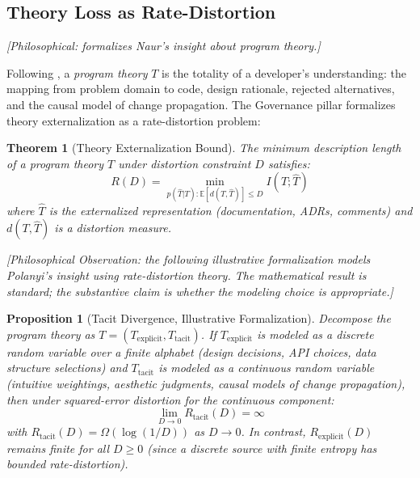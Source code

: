 \documentclass[11pt, a4paper]{googledeepmind}
\newtheorem{theorem}{Theorem}[section]
\newtheorem{proposition}{Proposition}[section]
\begin{document}
\subsection{Theory Loss as Rate-Distortion}
\label{sec:gov-theory}
\emph{[Philosophical: formalizes Naur's insight about program theory.]}

Following \citet{naur1985}, a \emph{program theory} $T$ is the totality of a developer's understanding: the mapping from problem domain to code, design rationale, rejected alternatives, and the causal model of change propagation. The Governance pillar formalizes theory externalization as a rate-distortion problem:

\begin{theorem}[Theory Externalization Bound]
\label{thm:theory-loss}
The minimum description length of a program theory $T$ under distortion constraint $D$ satisfies:
\begin{equation}
    R(D) = \min_{p(\hat{T}|T): \mathbb{E}[d(T,\hat{T})] \leq D} I(T; \hat{T})
\end{equation}
where $\hat{T}$ is the externalized representation (documentation, ADRs, comments) and $d(T, \hat{T})$ is a distortion measure.
\end{theorem}

\emph{[Philosophical Observation: the following illustrative formalization models Polanyi's insight using rate-distortion theory. The mathematical result is standard; the substantive claim is whether the modeling choice is appropriate.]}

\begin{proposition}[Tacit Divergence, Illustrative Formalization]
\label{conj:tacit}
Decompose the program theory as $T = (T_{\mathrm{explicit}}, T_{\mathrm{tacit}})$. \emph{If} $T_{\mathrm{explicit}}$ is modeled as a discrete random variable over a finite alphabet (design decisions, API choices, data structure selections) and $T_{\mathrm{tacit}}$ is modeled as a continuous random variable (intuitive weightings, aesthetic judgments, causal models of change propagation), then under squared-error distortion for the continuous component:
\begin{equation}
    \lim_{D \to 0} R_{\mathrm{tacit}}(D) = \infty
\end{equation}
with $R_{\mathrm{tacit}}(D) = \Omega(\log(1/D))$ as $D \to 0$. In contrast, $R_{\mathrm{explicit}}(D)$ remains finite for all $D \geq 0$ (since a discrete source with finite entropy has bounded rate-distortion).
\end{proposition}
\end{document}

